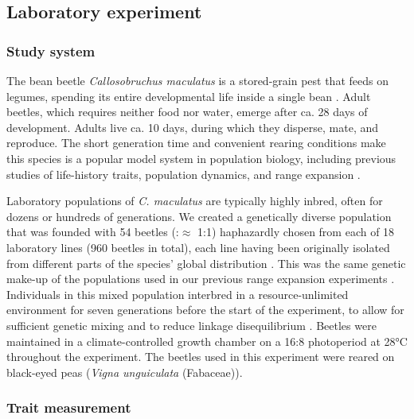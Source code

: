 \subsection{Laboratory experiment}

\subsubsection{Study system}

The bean beetle \textit{Callosobruchus maculatus} is a stored-grain pest that feeds on legumes, spending its entire developmental life inside a single bean \citep{fujii_behavioral_1990}. Adult beetles, which requires neither food nor water, emerge after ca. 28 days of development. Adults live ca. 10 days, during which they disperse, mate, and reproduce. The short generation time and convenient rearing conditions make this species is a popular model system in population biology, including previous studies of life-history traits, population dynamics, and range expansion \citep{bellows_analytical_1982,fujii_behavioral_1990,miller_confronting_2011,miller_sex_2013,wagner_genetic_2016,ochocki_rapid_2017}.

Laboratory populations of \textit{C. maculatus} are typically highly inbred, often for dozens or hundreds of generations. We created a genetically diverse population that was founded with 54 beetles (\female:\mars $\approx$ 1:1) haphazardly chosen from each of 18 laboratory lines (960 beetles in total), each line having been originally isolated from different parts of the species’ global distribution \citep{downey_comparative_2015}. This was the same genetic make-up of the populations used in our previous range expansion experiments \citep{ochocki_rapid_2017}. Individuals in this mixed population interbred in a resource-unlimited environment for seven generations before the start of the experiment, to allow for sufficient genetic mixing and to reduce linkage disequilibrium \citep{roughgarden_theory_1979,ochocki_rapid_2017}. Beetles were maintained in a climate-controlled growth chamber on a 16:8 photoperiod at 28°C throughout the experiment. The beetles used in this experiment were reared on black-eyed peas (\textit{Vigna unguiculata} (Fabaceae)). %

\subsubsection{Trait measurement}
